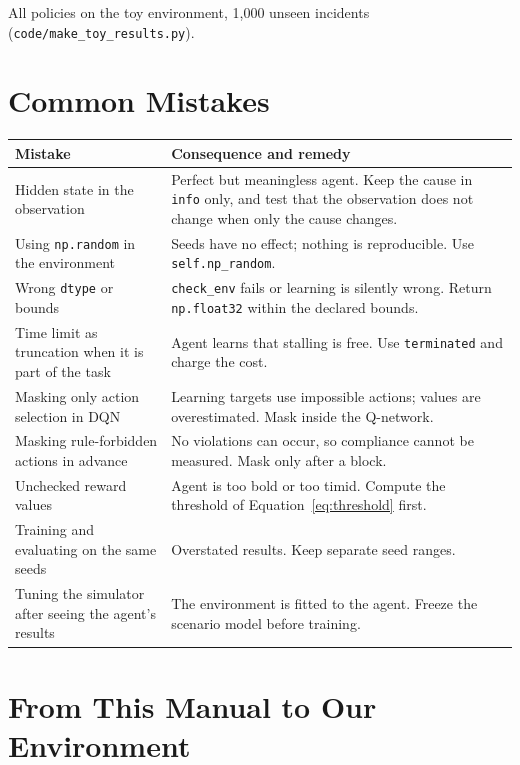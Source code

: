 \documentclass[11pt,a4paper]{article}
\begin{document}
\begin{table}[h]
\centering\small
\caption{All policies on the toy environment, 1{,}000 unseen incidents (\texttt{code/make\_toy\_results.py}).}
\label{tab:toyresults}

\end{table}

\section{Common Mistakes}

\begin{tabularx}{\textwidth}{@{}p{4.2cm}L@{}}
\toprule
Mistake & Consequence and remedy \\
\midrule
Hidden state in the observation & Perfect but meaningless agent. Keep the cause in \texttt{info} only, and test that the observation does not change when only the cause changes. \\
Using \texttt{np.random} in the environment & Seeds have no effect; nothing is reproducible. Use \texttt{self.np\_random}. \\
Wrong \texttt{dtype} or bounds & \texttt{check\_env} fails or learning is silently wrong. Return \texttt{np.float32} within the declared bounds. \\
Time limit as truncation when it is part of the task & Agent learns that stalling is free. Use \texttt{terminated} and charge the cost. \\
Masking only action selection in DQN & Learning targets use impossible actions; values are overestimated. Mask inside the Q-network. \\
Masking rule-forbidden actions in advance & No violations can occur, so compliance cannot be measured. Mask only after a block. \\
Unchecked reward values & Agent is too bold or too timid. Compute the threshold of Equation~\eqref{eq:threshold} first. \\
Training and evaluating on the same seeds & Overstated results. Keep separate seed ranges. \\
Tuning the simulator after seeing the agent's results & The environment is fitted to the agent. Freeze the scenario model before training. \\
\bottomrule
\end{tabularx}

\section{From This Manual to Our Environment}
\end{document}
